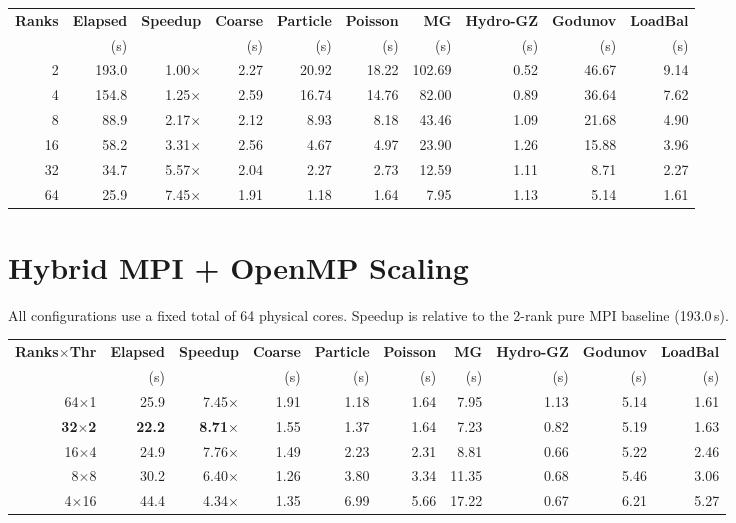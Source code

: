 \documentclass[11pt,fleqn]{book}
\begin{document}
\begin{center}
\begin{tabular}{rrrrrrrrrr}
\toprule
\textbf{Ranks} & \textbf{Elapsed} & \textbf{Speedup} & \textbf{Coarse} & \textbf{Particle} & \textbf{Poisson} & \textbf{MG} & \textbf{Hydro-GZ} & \textbf{Godunov} & \textbf{LoadBal} \\
 & (s) & & (s) & (s) & (s) & (s) & (s) & (s) & (s) \\
\midrule
2   & 193.0 & 1.00$\times$ & 2.27 & 20.92 & 18.22 & 102.69 & 0.52 & 46.67 & 9.14 \\
4   & 154.8 & 1.25$\times$ & 2.59 & 16.74 & 14.76 & 82.00  & 0.89 & 36.64 & 7.62 \\
8   &  88.9 & 2.17$\times$ & 2.12 &  8.93 &  8.18 & 43.46  & 1.09 & 21.68 & 4.90 \\
16  &  58.2 & 3.31$\times$ & 2.56 &  4.67 &  4.97 & 23.90  & 1.26 & 15.88 & 3.96 \\
32  &  34.7 & 5.57$\times$ & 2.04 &  2.27 &  2.73 & 12.59  & 1.11 &  8.71 & 2.27 \\
64  &  25.9 & 7.45$\times$ & 1.91 &  1.18 &  1.64 &  7.95  & 1.13 &  5.14 & 1.61 \\
\bottomrule
\end{tabular}
\end{center}

\section{Hybrid MPI + OpenMP Scaling}

All configurations use a fixed total of 64 physical cores.  Speedup is relative to the 2-rank pure MPI baseline (193.0\,s).

\begin{center}
\begin{tabular}{rrrrrrrrrr}
\toprule
\textbf{Ranks$\times$Thr} & \textbf{Elapsed} & \textbf{Speedup} & \textbf{Coarse} & \textbf{Particle} & \textbf{Poisson} & \textbf{MG} & \textbf{Hydro-GZ} & \textbf{Godunov} & \textbf{LoadBal} \\
 & (s) & & (s) & (s) & (s) & (s) & (s) & (s) & (s) \\
\midrule
64$\times$1  & 25.9 & 7.45$\times$ & 1.91 & 1.18 & 1.64 & 7.95  & 1.13 & 5.14 & 1.61 \\
\textbf{32$\times$2}  & \textbf{22.2} & \textbf{8.71$\times$} & 1.55 & 1.37 & 1.64 & 7.23  & 0.82 & 5.19 & 1.63 \\
16$\times$4  & 24.9 & 7.76$\times$ & 1.49 & 2.23 & 2.31 & 8.81  & 0.66 & 5.22 & 2.46 \\
8$\times$8   & 30.2 & 6.40$\times$ & 1.26 & 3.80 & 3.34 & 11.35 & 0.68 & 5.46 & 3.06 \\
4$\times$16  & 44.4 & 4.34$\times$ & 1.35 & 6.99 & 5.66 & 17.22 & 0.67 & 6.21 & 5.27 \\
\bottomrule
\end{tabular}
\end{center}
\end{document}
